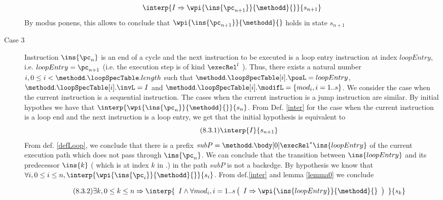 \begin{description}
\begin{equation*}
\begin{array}{l}
                  \interp{ I \Rightarrow \wpi{\ins{\pc_{n+1}}}{\methodd}{} }
                                     {s_{n+1}  } \\
    \end{array} 
\end{equation*}
By modus ponens, this allows to conclude that $\wpi{\ins{\pc_{n+1}}}{\methodd}{} $ holds in state 
$s_{n+1} $

\item [Case 3]
Instruction $\ins{\pc_n} $ is an end of a cycle  and the next instruction to be executed is a loop entry 
instruction at index $loopEntry $, i.e.  $loopEntry = \pc_{n +1}$ %
 (i.e. the execution step is of kind $\execRel^l$ ).
 Thus, there exists a natural number  $ i , 0 \le i < \methodd.\loopSpecTable.length   $   such that
 $ \methodd. \loopSpecTable[i].\posL = loopEntry $,  $ \methodd. \loopSpecTable[i].\invL = I $ and
   $ \methodd. \loopSpecTable[i].\modifL =\{ mod_i, i = 1..s \}$.
We consider the case when the current instruction is a sequential instruction. The cases when the current instruction 
is a jump instruction are similar. By initial hypothes we have that 
 $\interp{ \wpi{\ins{\pc_n} }{\methodd}{}}{s_n}$. 
From Def. \ref{inter}  for the case when the current instruction is a loop end and the next instruction is a loop entry, we get that the initial hypothesis
is equivalent to   
\begin{equation*} \label{eq12} \tag{8.3.1} 
 \interp{ I}{s_{n + 1}}  
\end{equation*} 
   From def. \ref{defLoop}, we  conclude that there is a prefix  $subP = \methodd.\body[0] \execRel^{*} \ins{loopEntry}$  of the current
 execution path which does not pass through $\ins{\pc_n}$. We can conclude that the transition between   $\ins{loopEntry}$ and its predecessor 
 $ \ins{k} $ ( which is at index $k$ in \methodd.\body)
	  in the path $subP$ is not a backedge. By hypothesis we know that 
           $ \forall i , 0 \le i \le  n, \interp{\wpi{\ins{\pc_i}}{\methodd}{}}{s_i}$.  From def.\ref{inter} and
	 lemma \ref{lemma0} we conclude 
          
   \begin{equation*} \label{eq13} \tag{8.3.2} 
         \exists k, 0 \le k \le n \Rightarrow 
         \interp{ \begin{array}{l}
	                                    I 
					    \wedge
                                           \forall mod_i ,  i = 1..s \left( \begin{array}{l } 
	                                                           I \Rightarrow 
	                                                           \wpi{\ins{loopEntry}}{\methodd}{} 
							      \end{array}\right)
				 \end{array} }{s_k} 
 \end{equation*} 


\end{description}
